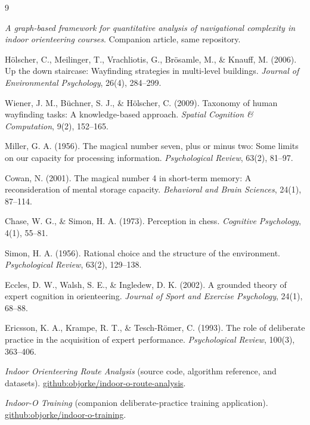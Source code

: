 \documentclass[11pt,a4paper,twocolumn]{article}
\begin{document}
\begin{thebibliography}{9}

\emph{A graph-based framework for quantitative analysis of navigational
complexity in indoor orienteering courses}. Companion article, same
repository.

H\"olscher, C., Meilinger, T., Vrachliotis, G., Br\"osamle, M., \& Knauff, M.
(2006). Up the down staircase: Wayfinding strategies in multi-level
buildings. \emph{Journal of Environmental Psychology}, 26(4), 284--299.

Wiener, J. M., B\"uchner, S. J., \& H\"olscher, C. (2009). Taxonomy of human
wayfinding tasks: A knowledge-based approach. \emph{Spatial Cognition \&
Computation}, 9(2), 152--165.

Miller, G. A. (1956). The magical number seven, plus or minus two: Some
limits on our capacity for processing information. \emph{Psychological
Review}, 63(2), 81--97.

Cowan, N. (2001). The magical number 4 in short-term memory: A
reconsideration of mental storage capacity. \emph{Behavioral and Brain
Sciences}, 24(1), 87--114.

Chase, W. G., \& Simon, H. A. (1973). Perception in chess. \emph{Cognitive
Psychology}, 4(1), 55--81.

Simon, H. A. (1956). Rational choice and the structure of the environment.
\emph{Psychological Review}, 63(2), 129--138.

Eccles, D. W., Walsh, S. E., \& Ingledew, D. K. (2002). A grounded theory of
expert cognition in orienteering. \emph{Journal of Sport and Exercise
Psychology}, 24(1), 68--88.

Ericsson, K. A., Krampe, R. T., \& Tesch-R\"omer, C. (1993). The role of
deliberate practice in the acquisition of expert performance.
\emph{Psychological Review}, 100(3), 363--406.

\emph{Indoor Orienteering Route Analysis} (source code, algorithm reference,
and datasets). \newblock
\url{github:objorke/indoor-o-route-analysis}.

\emph{Indoor-O Training} (companion deliberate-practice training
application). \newblock
\url{github:objorke/indoor-o-training}.

\end{thebibliography}
\end{document}

